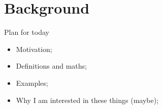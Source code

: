 \section*{Background}
\begin{frame}[t,plain]
\titlepage
\end{frame}
\begin{frame}{Plan for today}
 \begin{itemize}
  \item Motivation;
  \item Definitions and maths;
  \item Examples;
  \item Why I am interested in these things (maybe);
 \end{itemize}
\end{frame}
